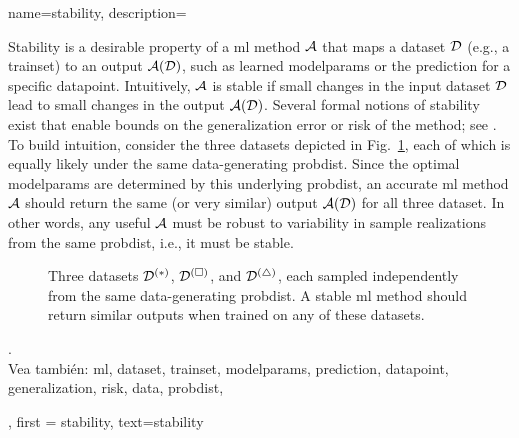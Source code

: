 	 
{name={stability},
	description={
		Stability is a desirable property of a \gls{ml} method $\mathcal{A}$ that maps a 
		\gls{dataset} $\mathcal{D}$ (e.g., a \gls{trainset}) to an output $\mathcal{A}(\mathcal{D})$, such as learned 
		\gls{modelparams} or the \gls{prediction} for a specific \gls{datapoint}. Intuitively, $\mathcal{A}$ is 
		stable if small changes in the input \gls{dataset} $\mathcal{D}$ lead to small changes in the 
		output $\mathcal{A}(\mathcal{D})$. Several formal notions of stability exist that enable bounds 
		on the \gls{generalization} error or \gls{risk} of the method; see \cite[Ch.~13]{ShalevMLBook}.
		To build intuition, consider the three datasets depicted in Fig.~\ref{fig_three_data_stability}, each 
		of which is equally likely under the same \gls{data}-generating \gls{probdist}. Since the 
		optimal \gls{modelparams} are determined by this underlying \gls{probdist}, an accurate 
		\gls{ml} method $\mathcal{A}$ should return the same (or very similar) output $\mathcal{A}(\mathcal{D})$ 
		for all three \gls{dataset}. In other words, any useful $\mathcal{A}$ must be robust to 
		variability in sample \gls{realization}s from the same \gls{probdist}, i.e., it must be stable. 
		\begin{figure}[htbp]
			\centering
			\caption{Three \gls{dataset}s $\mathcal{D}^{(*)}$, $\mathcal{D}^{(\square)}$, and $\mathcal{D}^{(\triangle)}$, 
				each sampled independently from the same \gls{data}-generating \gls{probdist}. A stable \gls{ml} 
				method should return similar outputs when trained on any of these \gls{dataset}s. \label{fig_three_data_stability}}
		\end{figure}.
		\\
		Vea también: \gls{ml}, \gls{dataset}, \gls{trainset}, \gls{modelparams}, \gls{prediction}, \gls{datapoint}, \gls{generalization}, \gls{risk}, \gls{data}, \gls{probdist},   }, 
	first = {stability}, text={stability} 
}

